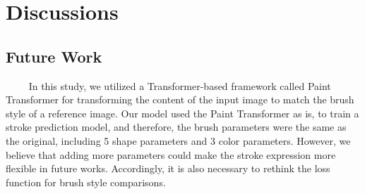 \chapter{Discussions}

\section{Future Work}　
　In this study, we utilized a Transformer-based framework called Paint 
Transformer \cite{liu2021paint} for transforming the content of the input image 
to match the brush style of a reference image.
Our model used the Paint Transformer as is, to train a stroke prediction model, 
and therefore, the brush parameters were the same as the original, including 5 
shape parameters and 3 color parameters. However, we believe that adding more 
parameters could make the stroke expression more flexible in future works.
Accordingly, it is also necessary to rethink the loss function for brush style 
comparisons.

